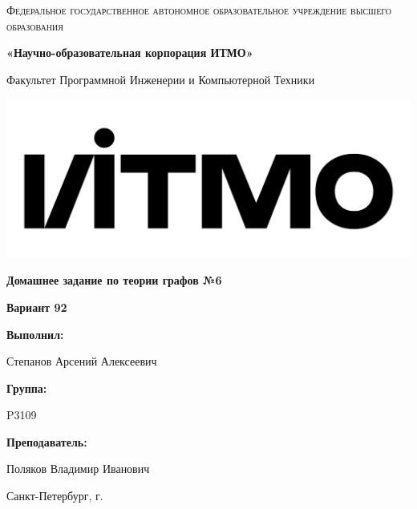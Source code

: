\documentclass[12pt,a4paper]{report}
\begin{document}
\begin{titlepage} 
	\centering
	{
        \scshape
        Федеральное государственное автономное образовательное учреждение высшего образования
        \par
        \textbf{«Научно-образовательная корпорация ИТМО»}
        \par
        \vspace*{1cm}
        Факультет Программной Инженерии и Компьютерной Техники
        \par
    }
    \vspace*{0.6cm}
    \includegraphics[width=\textwidth]{logo.png}
    {
        \Large
        \textbf{Домашнее задание по теории графов №6}
        \par
        \normalsize
        \vspace*{0.75cm}
        \textbf{Вариант 92}
        \par
    }
    \vfill
    \hfill\begin{minipage}{\dimexpr\textwidth-7.8cm}
        \textbf{Выполнил:}\par
        Степанов Арсений Алексеевич\par
        \vspace*{0.15cm}
        \textbf{Группа:}\par
        P3109\par
        \vspace*{0.15cm}
        \textbf{Преподаватель:}\par
        Поляков Владимир Иванович\par
    \end{minipage}
    \vfill
    Санкт-Петербург, \the\year{}г.
\end{titlepage}   
\onehalfspacing
\end{document}
